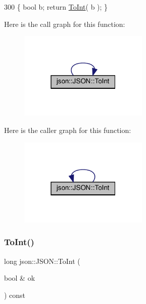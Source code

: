 \begin{DoxyCode}
300 \{ \textcolor{keywordtype}{bool} b; \textcolor{keywordflow}{return} \mbox{\hyperlink{classjson_1_1_j_s_o_n_a867eb9869140b69428287c98d4f56388}{ToInt}}( b ); \}
\end{DoxyCode}
Here is the call graph for this function\+:
\nopagebreak
\begin{figure}[H]
\begin{center}
\leavevmode
\includegraphics[width=175pt]{classjson_1_1_j_s_o_n_a867eb9869140b69428287c98d4f56388_cgraph}
\end{center}
\end{figure}
Here is the caller graph for this function\+:
\nopagebreak
\begin{figure}[H]
\begin{center}
\leavevmode
\includegraphics[width=175pt]{classjson_1_1_j_s_o_n_a867eb9869140b69428287c98d4f56388_icgraph}
\end{center}
\end{figure}
\mbox{\label{classjson_1_1_j_s_o_n_a12e5b118ced359fd4a315c95a7486007}} 
\subsubsection{\texorpdfstring{To\+Int()}{ToInt()}\hspace{0.1cm}{\footnotesize\ttfamily [2/2]}}
{\footnotesize\ttfamily long json\+::\+J\+S\+O\+N\+::\+To\+Int (\begin{DoxyParamCaption}\item[{bool \&}]{ok }\end{DoxyParamCaption}) const\hspace{0.3cm}{\ttfamily [inline]}}



